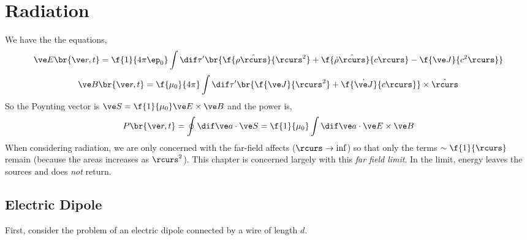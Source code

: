 \documentclass{article}
\begin{document}
\section{Radiation}

We have the the  equations,
\[ \ve E \br{\ve r, t} = \f{1}{4 \pi\ep_0} \int \dif \tau' \br{\f{\rho \hat \rcurs}{\rcurs^2} + \f{\dot \rho \hat \rcurs}{c \rcurs}- \f{\ve J}{c^2 \rcurs}}  \]
\[ \ve B \br{\ve r, t} = \f{\mu_0}{4 \pi} \int \dif \tau' \br{\f{\ve J}{\rcurs^2} + \f{\dot {\ve J}}{c \rcurs}}\times \hat \rcurs \]
So the Poynting vector is $\ve S = \f{1}{\mu_0} \ve E \times \ve B$ and the power is,
\[ P\br{\ve r, t} = \oint \dif \ve a \cdot \ve S = \f{1}{\mu_0} \int \dif \ve a \cdot \ve E\times \ve B \]
When considering radiation, we are only concerned with the far-field affects ($\rcurs \to \inf$) so that only the terms $\sim \f{1}{\rcurs}$ remain (because the areas increases as $\rcurs^2$). This chapter is concerned largely with this \textit{far field limit}. In the limit, energy leaves the sources and does \textit{not} return. \\

\subsection{Electric Dipole}
First, consider the problem of an electric dipole connected by a wire of length $d$.

\begin{center}
\end{center}
\end{document}
